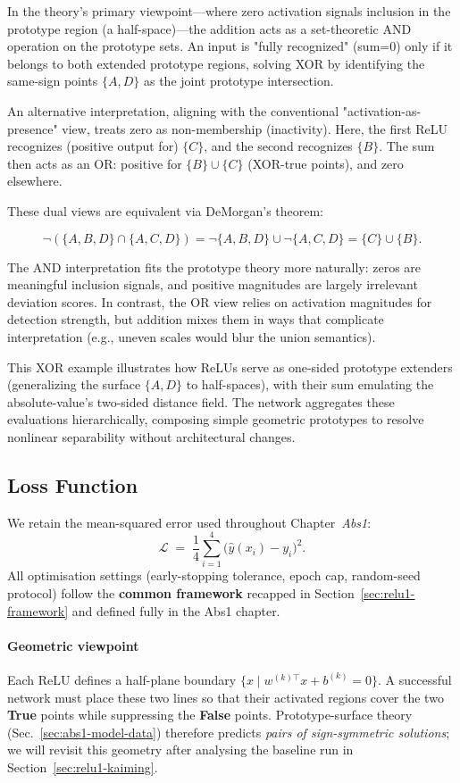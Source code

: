 In the theory's primary viewpoint---where zero activation signals inclusion in the prototype region (a half-space)---the addition acts as a set-theoretic AND operation on the prototype sets. An input is "fully recognized" (sum=0) only if it belongs to both extended prototype regions, solving XOR by identifying the same-sign points $\{A, D\}$ as the joint prototype intersection.

An alternative interpretation, aligning with the conventional "activation-as-presence" view, treats zero as non-membership (inactivity). Here, the first ReLU recognizes (positive output for) $\{C\}$, and the second recognizes $\{B\}$. The sum then acts as an OR: positive for $\{B\} \cup \{C\}$ (XOR-true points), and zero elsewhere.

These dual views are equivalent via DeMorgan's theorem:

\[
    \neg(\{A, B, D\} \cap \{A, C, D\}) = \neg\{A, B, D\} \cup \neg\{A, C, D\} = \{C\} \cup \{B\}.
\]

The AND interpretation fits the prototype theory more naturally: zeros are meaningful inclusion signals, and positive magnitudes are largely irrelevant deviation scores. In contrast, the OR view relies on activation magnitudes for detection strength, but addition mixes them in ways that complicate interpretation (e.g., uneven scales would blur the union semantics).

This XOR example illustrates how ReLUs serve as one-sided prototype extenders (generalizing the surface $\{A, D\}$ to half-spaces), with their sum emulating the absolute-value's two-sided distance field. The network aggregates these evaluations hierarchically, composing simple geometric prototypes to resolve nonlinear separability without architectural changes.

\subsection*{Loss Function}
We retain the mean-squared error used throughout Chapter~\textit{Abs1}:
\begin{equation}
    \mathcal{L}
    \;=\;
    \frac14
    \sum_{i=1}^{4}
    \bigl(\hat y(x_i) - y_i\bigr)^2.
    \label{eq:relu1-loss}
\end{equation}
All optimisation settings (early-stopping tolerance, epoch cap, random-seed protocol) follow the \textbf{common framework} recapped in Section~\ref{sec:relu1-framework} and defined fully in the Abs1 chapter.

\paragraph{Geometric viewpoint}
Each ReLU defines a half-plane boundary \(\{x\mid w^{(k)\!\top}x+b^{(k)}=0\}\). A successful network must place these two lines so that their activated regions cover the two \textbf{True} points while suppressing the \textbf{False} points. Prototype-surface theory (Sec.~\ref{sec:abs1-model-data}) therefore predicts \emph{pairs of sign-symmetric solutions}; we will revisit this geometry after analysing the baseline run in Section~\ref{sec:relu1-kaiming}.
